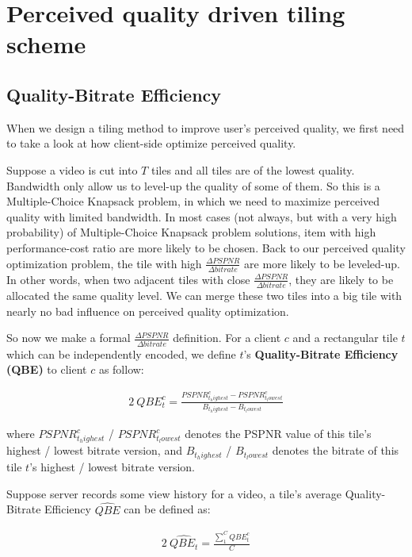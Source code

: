 \section{Perceived quality driven tiling scheme}

\subsection{Quality-Bitrate Efficiency}

When we design a tiling method to improve user's perceived quality, we first need to take a look at how client-side optimize perceived quality.

Suppose a video is cut into $T$ tiles and all tiles are of the lowest quality. Bandwidth only allow us to level-up the quality of some of them. So this is a Multiple-Choice Knapsack problem, in which we need to maximize perceived quality with limited bandwidth. In most cases (not always, but with a very high probability) of Multiple-Choice Knapsack problem solutions, item with high performance-cost ratio are more likely to be chosen. Back to our perceived quality optimization problem, the tile with high $\frac{\Delta PSPNR}{\Delta bitrate}$ are more likely to be leveled-up. In other words, when two adjacent tiles with close $\frac{\Delta PSPNR}{\Delta bitrate}$, they are likely to be allocated the same quality level. We can merge these two tiles into a big tile with nearly no bad influence on perceived quality optimization.

So now we make a formal $\frac{\Delta PSPNR}{\Delta bitrate}$ definition. For a client $c$ and a rectangular tile $t$ which can be independently encoded, we define $t$'s \textbf{Quality-Bitrate Efficiency (QBE)} to client $c$ as follow:

\begin{alignat}{2}\
QBE_t^c = \frac{PSPNR_{t_highest}^c - PSPNR_{t_lowest}^c}{B_{t_highest} - B_{t_lowest}} \label{QBE}
\end{alignat}

where $PSPNR_{t_highest}^c$ / $PSPNR_{t_lowest}^c$ denotes the PSPNR value of this tile's highest / lowest bitrate version, and $B_{t_highest}$ / $B_{t_lowest}$ denotes the bitrate of this tile $t$'s highest / lowest bitrate version. 

Suppose server records some view history for a video, a tile's average Quality-Bitrate Efficiency $\hat{QBE}$ can be defined as:

\begin{alignat}{2}\
\hat{QBE_t} = \frac{\sum_1^C{QBE_t^c}}{C} \label{avgQBE}
\end{alignat}


